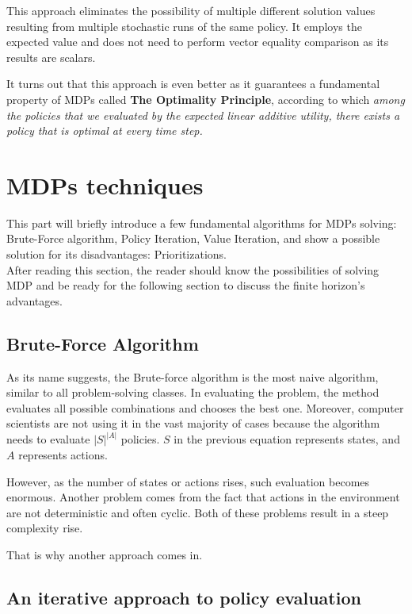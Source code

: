 This approach eliminates the possibility of multiple different solution values resulting from multiple stochastic runs of the same policy. It employs the expected value and does not need to perform vector equality comparison as its results are scalars.

It turns out that this approach is even better as it guarantees a fundamental property of MDPs called \textbf{The Optimality Principle}, according to which \textit{among the policies that we evaluated by the expected linear additive utility, there exists a policy that is optimal at every time step.}

\section{MDPs techniques}

This part will briefly introduce a few fundamental algorithms for MDPs solving: Brute-Force algorithm, Policy Iteration, Value Iteration, and show a possible solution for its disadvantages: Prioritizations. \\
After reading this section, the reader should know the possibilities of solving MDP and be ready for the following section to discuss the finite horizon's advantages.

\subsection{Brute-Force Algorithm}
As its name suggests, the Brute-force algorithm is the most naive algorithm, similar to all problem-solving classes. In evaluating the problem, the method evaluates all possible combinations and chooses the best one.
Moreover, computer scientists are not using it in the vast majority of cases because the algorithm needs to evaluate $|S|^{|A|}$ policies.
$S$ in the previous equation represents states, and $A$ represents actions.

However, as the number of states or actions rises, such evaluation becomes enormous. Another problem comes from the fact that actions in the environment are not deterministic and often cyclic. Both of these problems result in a steep complexity rise.

That is why another approach comes in.

\subsection{An iterative approach to policy evaluation}

